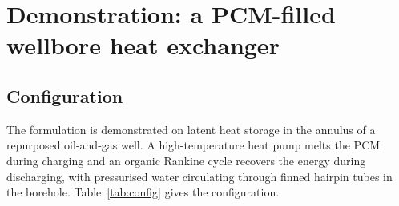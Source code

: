 \section{Demonstration: a PCM-filled wellbore heat exchanger}
\label{sec:demo}

\subsection{Configuration}

The formulation is demonstrated on latent heat storage in the annulus of a
repurposed oil-and-gas well. A high-temperature heat pump melts the PCM during
charging and an organic Rankine cycle recovers the energy during discharging,
with pressurised water circulating through finned hairpin tubes in the borehole.
Table~\ref{tab:config} gives the configuration.

